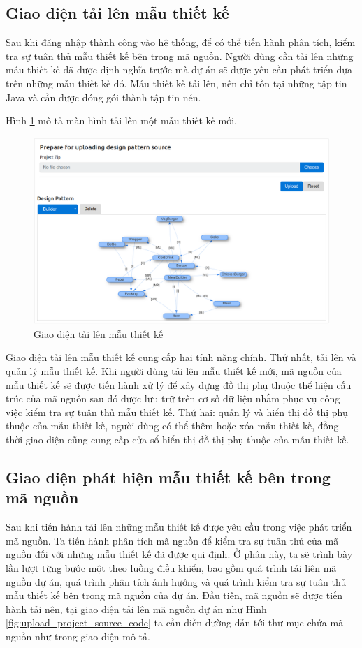 \documentclass[12pt]{report}
\begin{document}
\subsection{Giao diện tải lên mẫu thiết kế}
Sau khi đăng nhập thành công vào hệ thống, để có thể tiến hành phân tích, kiểm tra sự tuân thủ mẫu thiết kế bên trong mã nguồn. Người dùng cần tải lên những mẫu thiết kế đã được định nghĩa trước mà dự án sẽ được yêu cầu phát triển dựa trên những mẫu thiết kế đó. Mẫu thiết kế tải lên, nên chỉ tồn tại những tập tin Java và cần được đóng gói thành tập tin nén.
 
\noindent Hình \ref{fig:ds_upload_example} mô tả màn hình tải lên một mẫu thiết kế mới.
\begin{figure}[h]
	\centering
	\includegraphics[scale=0.4]{images/ds_upload_example}
	\caption{Giao diện tải lên mẫu thiết kế}
	\label{fig:ds_upload_example}
\end{figure}
Giao diện tải lên mẫu thiết kế cung cấp hai tính năng chính. Thứ nhất, tải lên và quản lý mẫu thiết kế. Khi người dùng tải lên mẫu thiết kế mới, mã nguồn của mẫu thiết kế sẽ được tiến hành xử lý để xây dựng đồ thị phụ thuộc thể hiện cấu trúc của mã nguồn sau đó được lưu trữ trên cơ sở dữ liệu nhằm phục vụ công việc kiểm tra sự tuân thủ mẫu thiết kế. Thứ hai: quản lý và hiển thị đồ thị phụ thuộc của mẫu thiết kế, người dùng có thể thêm hoặc xóa mẫu thiết kế, đồng thời giao diện cũng cung cấp cửa sổ hiển thị đồ thị phụ thuộc của mẫu thiết kế.
\subsection{Giao diện phát hiện mẫu thiết kế bên trong mã nguồn}
Sau khi tiến hành tải lên những mẫu thiết kế được yêu cầu trong việc phát triển mã nguồn. Ta tiến hành phân tích mã nguồn để kiểm tra sự tuân thủ của mã nguồn đối với những mẫu thiết kế đã được qui định. Ở phân này, ta sẽ trình bày lần lượt từng bước một theo luồng điều khiển, bao gồm quá trình tải liên mã nguồn dự án, quá trình phân tích ảnh hưởng và quá trình kiểm tra sự tuân thủ mẫu thiết kế bên trong mã nguồn của dự án.
Đầu tiên, mã nguồn sẽ được tiến hành tải nên, tại giao diện tải lên mã nguồn dự án như Hình \ref{fig:upload_project_source_code} ta cần điền đường dẫn tới thư mục chứa mã nguồn như trong giao diện mô tả.
\end{document}
